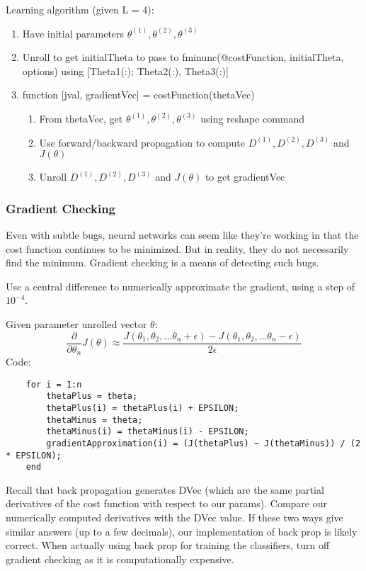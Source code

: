 \documentclass[11pt,letterpaper]{article}
\begin{document}
Learning algorithm (given L = 4):
\begin{enumerate}
	\item Have initial parameters $\theta^{(1)}, \theta^{(2)}, \theta^{(3)}$
	\item Unroll to get initialTheta to pass to fminunc(@costFunction, initialTheta, options) using [Theta1(:); Theta2(:), Theta3(:)]
	\item function [jval, gradientVec] = costFunction(thetaVec)
	\begin{enumerate}
		\item From thetaVec, get $\theta^{(1)}, \theta^{(2)}, \theta^{(3)}$ using reshape command
		\item Use forward/backward propagation to compute $D^{(1)}, D^{(2)}, D^{(3)}$ and $J(\theta)$
		\item Unroll $D^{(1)}, D^{(2)}, D^{(3)}$ and $J(\theta)$ to get gradientVec
	\end{enumerate}
\end{enumerate}

\subsubsection{Gradient Checking}
Even with subtle bugs, neural networks can seem like they're working in that the cost function continues to be minimized. But in reality, they do not necessarily find the minimum. Gradient checking is a means of detecting such bugs.

Use a central difference to numerically approximate the gradient, using a step of $10^{-4}$.

Given parameter unrolled vector $\theta$:
$$\frac{\partial}{\partial \theta_n} J(\theta) \approx \frac	{J(\theta_1, \theta_2,...\theta_n + \epsilon) - J(\theta_1,\theta_2,...\theta_n - \epsilon)}{2\epsilon} $$
Code:
\begin{lstlisting}
	for i = 1:n
		thetaPlus = theta;
		thetaPlus(i) = thetaPlus(i) + EPSILON;
		thetaMinus = theta;
		thetaMinus(i) = thetaMinus(i) - EPSILON;
		gradientApproximation(i) = (J(thetaPlus) − J(thetaMinus)) / (2 * EPSILON);
	end
\end{lstlisting}
Recall that back propagation generates DVec (which are the same partial derivatives of the cost function with respect to our params). Compare our numerically computed derivatives with the DVec value. If these two ways give similar answers (up to a few decimals), our implementation of back prop is likely correct. When actually using back prop for training the classifiers, turn off gradient checking as it is computationally expensive.
\end{document}
